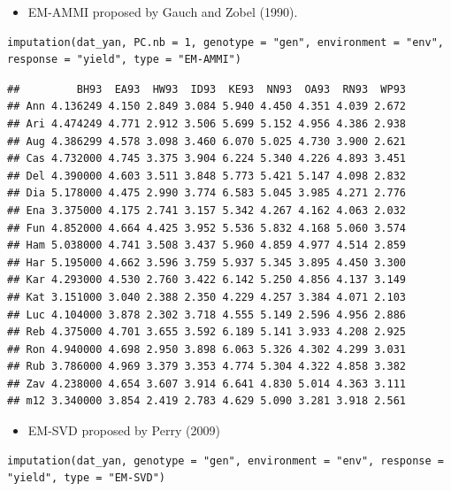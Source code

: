 \begin{itemize}
\item EM-AMMI proposed by Gauch and Zobel (1990).
\end{itemize}
\begin{lstlisting}
imputation(dat_yan, PC.nb = 1, genotype = "gen", environment = "env", response = "yield", type = "EM-AMMI")
\end{lstlisting}

\begin{verbatim}
##         BH93  EA93  HW93  ID93  KE93  NN93  OA93  RN93  WP93
## Ann 4.136249 4.150 2.849 3.084 5.940 4.450 4.351 4.039 2.672
## Ari 4.474249 4.771 2.912 3.506 5.699 5.152 4.956 4.386 2.938
## Aug 4.386299 4.578 3.098 3.460 6.070 5.025 4.730 3.900 2.621
## Cas 4.732000 4.745 3.375 3.904 6.224 5.340 4.226 4.893 3.451
## Del 4.390000 4.603 3.511 3.848 5.773 5.421 5.147 4.098 2.832
## Dia 5.178000 4.475 2.990 3.774 6.583 5.045 3.985 4.271 2.776
## Ena 3.375000 4.175 2.741 3.157 5.342 4.267 4.162 4.063 2.032
## Fun 4.852000 4.664 4.425 3.952 5.536 5.832 4.168 5.060 3.574
## Ham 5.038000 4.741 3.508 3.437 5.960 4.859 4.977 4.514 2.859
## Har 5.195000 4.662 3.596 3.759 5.937 5.345 3.895 4.450 3.300
## Kar 4.293000 4.530 2.760 3.422 6.142 5.250 4.856 4.137 3.149
## Kat 3.151000 3.040 2.388 2.350 4.229 4.257 3.384 4.071 2.103
## Luc 4.104000 3.878 2.302 3.718 4.555 5.149 2.596 4.956 2.886
## Reb 4.375000 4.701 3.655 3.592 6.189 5.141 3.933 4.208 2.925
## Ron 4.940000 4.698 2.950 3.898 6.063 5.326 4.302 4.299 3.031
## Rub 3.786000 4.969 3.379 3.353 4.774 5.304 4.322 4.858 3.382
## Zav 4.238000 4.654 3.607 3.914 6.641 4.830 5.014 4.363 3.111
## m12 3.340000 3.854 2.419 2.783 4.629 5.090 3.281 3.918 2.561
\end{verbatim}



\begin{itemize}
\item EM-SVD proposed by Perry (2009)
\end{itemize}
\begin{lstlisting}
imputation(dat_yan, genotype = "gen", environment = "env", response = "yield", type = "EM-SVD")
\end{lstlisting}

